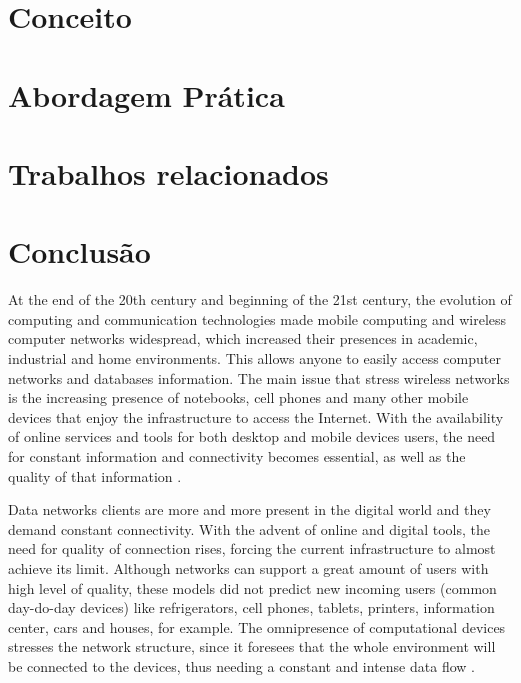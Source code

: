 \documentclass[10pt, conference, compsocconf]{IEEEtran}
\begin{document}
\section{Conceito}\label{sec:concept}


\section{Abordagem Prática}\label{sec:pratica}


\section{Trabalhos relacionados}\label{sec:rel}


\section{Conclusão}\label{sec:con}



At the end of the 20th century and beginning of the 21st century, the evolution of computing and communication technologies made mobile computing and wireless computer networks widespread, which increased their presences in academic, industrial and home environments. This allows anyone to easily access computer networks and databases information. The main issue that stress wireless networks is the increasing presence of notebooks, cell phones and many other mobile devices that enjoy the infrastructure to access the Internet. With the availability of online services and tools for both desktop and mobile devices users, the need for constant information and connectivity becomes essential, as well as the quality of that information \cite{Zhu:1276870}.

Data networks clients are more and more present in the digital world and they demand constant connectivity. With the advent of online and digital tools, the need for quality of connection rises, forcing the current infrastructure to almost achieve its limit. Although networks can support a great amount of users with high level of quality, these models did not predict new incoming users (common day-do-day devices) like refrigerators, cell phones, tablets, printers, information center, cars and houses, for example. The omnipresence of computational devices stresses the network structure, since it foresees that the whole environment will be connected to the devices, thus needing a constant and intense data flow \cite{Akyildiz:1509968}\cite{Zhu:1276870}.
\end{document}
